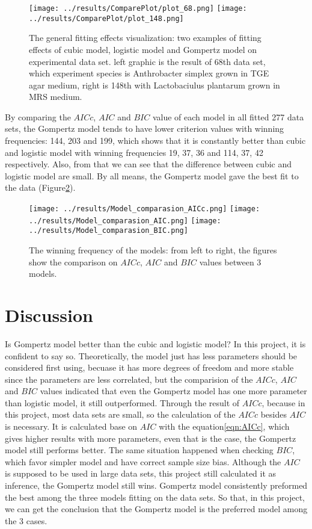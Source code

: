 \documentclass[11pt, a4paper]{article}
\begin{document}
\begin{figure}\centering
  \texttt{[image: ../results/ComparePlot/plot\_68.png]}
  \texttt{[image: ../results/ComparePlot/plot\_148.png]}
  \caption{\label{res_visual}The general fitting effects visualization: two examples of fitting effects of cubic model, logistic model and Gompertz model on experimental data set. 
  left graphic is the result of 68th data set, which experiment species is Anthrobacter simplex grown in TGE agar medium, right is 148th with Lactobaciulus plantarum grown in MRS medium.}
  \end{figure}
 
By comparing the $AICc$, $AIC$ and $BIC$ value of each model in all fitted 277 data sets, the Gompertz model tends to have lower criterion values with winning frequencies: 144, 203 and 199, which shows that it is constantly better than cubic and logistic model with winning frequencies 19, 37, 36 and 114, 37, 42 respectively. Also, from that we can see that the difference between cubic and logistic model are small. By all means, the Gompertz model gave the best fit to the data (Figure\ref{res_freq}). 

\begin{figure}\centering
  \texttt{[image: ../results/Model\_comparasion\_AICc.png]}
  \texttt{[image: ../results/Model\_comparasion\_AIC.png]}
  \texttt{[image: ../results/Model\_comparasion\_BIC.png]}
  \caption{\label{res_freq}The winning frequency of the models: from left to right, the figures show the comparison on $AICc$, $AIC$ and $BIC$ values between 3 models.}
  \end{figure}


\section{Discussion}

Is Gompertz model better than the cubic and logistic model? In this project, it is confident to say so. Theoretically, the model just has less parameters should be considered first using, becuase it has more degrees of freedom and more stable since the parameters are less correlated, but the comparision of the $AICc$, $AIC$ and $BIC$ values indicated that even the Gompertz model has one more parameter than logistic model, it still outperformed. Through the result of $AICc$, because in this project, most data sets are small, so the calculation of the $AICc$ besides $AIC$ is necessary. It is calculated base on $AIC$ with the equation\ref{eqn:AICc}, which gives higher results with more parameters, even that is the case, the Gompertz model still performs better. The same situation happened when checking $BIC$, which favor simpler model and have correct sample size bias. Although the $AIC$ is supposed to be used in large data sets, this project still calculated it as inference, the Gompertz model still wins. Gompertz model consistently preformed the best among the three models fitting on the data sets. So that, in this project, we can get the conclusion that the Gompertz model is the preferred model among the 3 cases.
\end{document}
